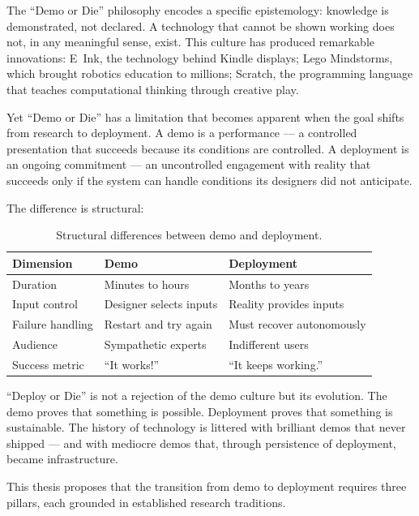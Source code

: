 \documentclass[11pt,a4paper]{article}
\begin{document}
The ``Demo or Die'' philosophy encodes a specific epistemology: knowledge is demonstrated, not declared. A technology that cannot be shown working does not, in any meaningful sense, exist. This culture has produced remarkable innovations: E~Ink, the technology behind Kindle displays; Lego Mindstorms, which brought robotics education to millions; Scratch, the programming language that teaches computational thinking through creative play.

Yet ``Demo or Die'' has a limitation that becomes apparent when the goal shifts from research to deployment. A demo is a performance --- a controlled presentation that succeeds because its conditions are controlled. A deployment is an ongoing commitment --- an uncontrolled engagement with reality that succeeds only if the system can handle conditions its designers did not anticipate.

The difference is structural:

\begin{table}[h]
\centering
\begin{tabular}{@{}lll@{}}
\toprule
\textbf{Dimension} & \textbf{Demo} & \textbf{Deployment} \\
\midrule
Duration & Minutes to hours & Months to years \\
Input control & Designer selects inputs & Reality provides inputs \\
Failure handling & Restart and try again & Must recover autonomously \\
Audience & Sympathetic experts & Indifferent users \\
Success metric & ``It works!'' & ``It keeps working.'' \\
\bottomrule
\end{tabular}
\caption{Structural differences between demo and deployment.}
\label{tab:demo-vs-deploy}
\end{table}

``Deploy or Die'' is not a rejection of the demo culture but its evolution. The demo proves that something is possible. Deployment proves that something is sustainable. The history of technology is littered with brilliant demos that never shipped --- and with mediocre demos that, through persistence of deployment, became infrastructure.

This thesis proposes that the transition from demo to deployment requires three pillars, each grounded in established research traditions.

\end{document}
